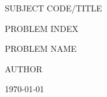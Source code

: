 \begin{center}
  SUBJECT CODE/TITLE \par\vspace{1cm}
  {\large PROBLEM INDEX} \par\vspace{.5cm}
  {\Large PROBLEM NAME} \par\vspace{.5cm}
  AUTHOR \par\vspace{1cm}
  \today
\end{center}
